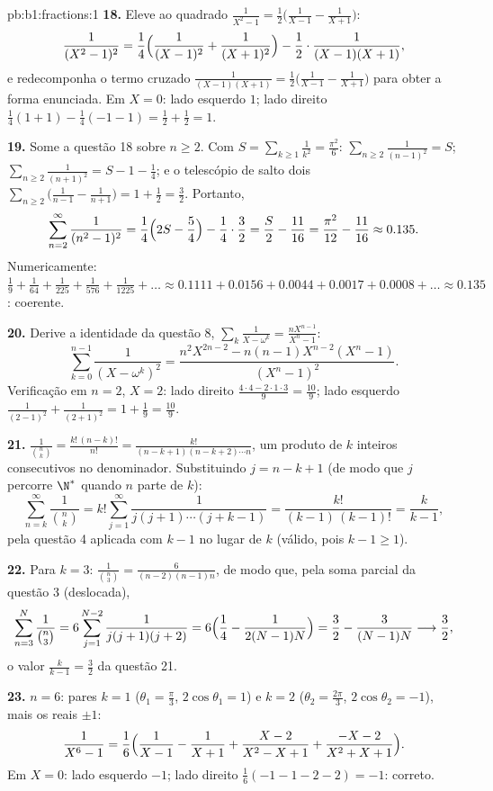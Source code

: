 \begin{solution}{pb:b1:fractions:1}
\textbf{18.} Eleve ao quadrado $\frac1{X^2-1} = \frac12\bigl(\frac1{X-1} -
\frac1{X+1}\bigr)$:
\[
\frac1{(X^2-1)^2} = \frac14\Bigl(\frac1{(X-1)^2} +
\frac1{(X+1)^2}\Bigr) - \frac12\cdot\frac1{(X-1)(X+1)} ,
\]
e redecomponha o termo cruzado $\frac1{(X-1)(X+1)} =
\frac12\bigl(\frac1{X-1} - \frac1{X+1}\bigr)$ para obter a forma
enunciada. Em $X = 0$: lado esquerdo $1$; lado direito $\frac14(1 + 1) -
\frac14(-1 - 1) = \frac12 + \frac12 = 1$.

\textbf{19.} Some a questão 18 sobre $n \geq 2$. Com $S =
\sum_{k\geq1}\frac1{k^2} = \frac{\pi^2}6$: $\sum_{n\geq2}
\frac1{(n-1)^2} = S$; $\sum_{n\geq2}\frac1{(n+1)^2} = S - 1 -
\frac14$; e o telescópio de salto dois $\sum_{n\geq2}\bigl(
\frac1{n-1} - \frac1{n+1}\bigr) = 1 + \frac12 = \frac32$. Portanto,
\[
\sum_{n=2}^{\infty}\frac1{(n^2-1)^2}
= \frac14\Bigl(2S - \frac54\Bigr) - \frac14\cdot\frac32
= \frac S2 - \frac{11}{16}
= \frac{\pi^2}{12} - \frac{11}{16} \approx 0.135 .
\]
Numericamente: $\frac19 + \frac1{64} + \frac1{225} + \frac1{576} +
\frac1{1225} + \dots \approx 0.1111 + 0.0156 + 0.0044 + 0.0017 +
0.0008 + \dots \approx 0.135$: coerente.

\textbf{20.} Derive a identidade da questão 8,
$\sum_k\frac1{X-\omega^k} = \frac{nX^{n-1}}{X^n-1}$:
\[
\sum_{k=0}^{n-1}\frac1{(X - \omega^k)^2}
= \frac{n^2X^{2n-2} - n(n-1)X^{n-2}(X^n - 1)}{(X^n - 1)^2} .
\]
Verificação em $n = 2$, $X = 2$: lado direito $\frac{4\cdot4 -
2\cdot1\cdot3}{9} = \frac{10}9$; lado esquerdo $\frac1{(2-1)^2} +
\frac1{(2+1)^2} = 1 + \frac19 = \frac{10}9$.

\textbf{21.} $\frac1{\binom nk} = \frac{k!\,(n-k)!}{n!} =
\frac{k!}{(n-k+1)(n-k+2)\cdots n}$, um produto de $k$ inteiros
consecutivos no denominador. Substituindo $j = n - k + 1$ (de modo que $j$
percorre $\N^*$ quando $n$ parte de $k$):
\[
\sum_{n=k}^{\infty}\frac1{\binom nk}
= k!\sum_{j=1}^{\infty}\frac1{j(j+1)\cdots(j+k-1)}
= \frac{k!}{(k-1)\,(k-1)!} = \frac{k}{k-1} ,
\]
pela questão 4 aplicada com $k - 1$ no lugar de $k$ (válido, pois
$k - 1 \geq 1$).

\textbf{22.} Para $k = 3$: $\frac1{\binom n3} =
\frac6{(n-2)(n-1)n}$, de modo que, pela soma parcial da questão 3 (deslocada),
\[
\sum_{n=3}^{N}\frac1{\binom n3}
= 6\sum_{j=1}^{N-2}\frac1{j(j+1)(j+2)}
= 6\Bigl(\frac14 - \frac1{2(N-1)N}\Bigr)
= \frac32 - \frac3{(N-1)N}
\longrightarrow \frac32 ,
\]
o valor $\frac k{k-1} = \frac32$ da questão 21.

\textbf{23.} $n = 6$: pares $k = 1$ ($\theta_1 = \frac\pi3$,
$2\cos\theta_1 = 1$) e $k = 2$ ($\theta_2 = \frac{2\pi}3$,
$2\cos\theta_2 = -1$), mais os  reais $\pm1$:
\[
\frac1{X^6-1} = \frac16\Bigl(\frac1{X-1} - \frac1{X+1}
+ \frac{X - 2}{X^2 - X + 1}
+ \frac{-X - 2}{X^2 + X + 1}\Bigr) .
\]
Em $X = 0$: lado esquerdo $-1$; lado direito $\frac16(-1 - 1 - 2 - 2)
= -1$: correto.


\end{solution}
